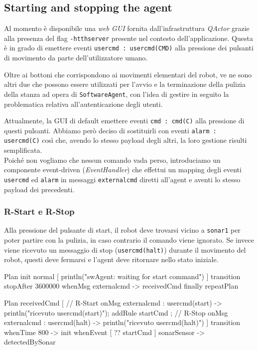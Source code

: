 \documentclass{../llncs}
\newcommand{\codescript}[1]{{\mbox{\small{\texttt{#1}}}}\xspace}
\newcommand{\code}[1]{{\color{blue}\small{\texttt{#1}}}}
\newcommand{\qa}{\textsf{\textit{QActor}}\xspace}
\begin{document}
\subsection{Starting and stopping the agent}
Al momento è disponibile una \emph{web GUI} fornita dall'infrastruttura \qa grazie alla presenza del flag \codescript{-htthserver} presente nel contesto dell'applicazione. Questa è in grado di emettere eventi \codescript{usercmd : usercmd(CMD)} alla pressione dei pulsanti di movimento da parte dell'utilizzatore umano.

Oltre ai bottoni che corrispondono ai movimenti elementari del robot, ve ne sono altri due che possono essere utilizzati per l'avvio e la terminazione della pulizia della stanza ad opera di \texttt{SoftwareAgent}, con l'idea di gestire in seguito la problematica relativa all'autenticazione degli utenti.

Attualmente, la GUI di default emettere eventi \codescript{cmd : cmd(C)} alla pressione di questi pulsanti. Abbiamo però deciso di sostituirli con eventi \codescript{alarm : usercmd(C)} così che, avendo lo stesso payload degli altri, la loro gestione risulti semplificata.\\

Poiché non vogliamo che nessun comando vada perso, introduciamo un componente event-driven (\emph{EventHandler}) che effettui un mapping degli eventi \codescript{usercmd} ed \codescript{alarm} in messaggi \codescript{externalcmd} diretti all'agent e aventi lo stesso payload dei precedenti.

\subsubsection{R-Start e R-Stop}
Alla pressione del pulsante di start, il robot deve trovarsi vicino a \code{sonar1} per poter partire con la pulizia, in caso contrario il comando viene ignorato. Se invece viene ricevuto un messaggio di stop (\codescript{usercmd(halt)}) durante il movimento del robot, questi deve fermarsi e l'agent deve ritornare nello stato iniziale.\\

\begin{qacode}[caption={SoftwareAgent, pt1}]
Plan init normal [
   	println("swAgent: waiting for start command")
]
transition stopAfter 3600000
	whenMsg externalcmd -> receivedCmd
finally repeatPlan

Plan receivedCmd [
	// R-Start
	onMsg externalcmd : usercmd(start) -> {
   		println("ricevuto usercmd(start)");
   		addRule startCmd
	};
	// R-Stop
   	onMsg externalcmd : usercmd(halt) -> println("ricevuto usercmd(halt)")
]
transition
	whenTime 800 -> init
	whenEvent [ ?? startCmd ] sonarSensor -> detectedBySonar
\end{qacode}
\end{document}
